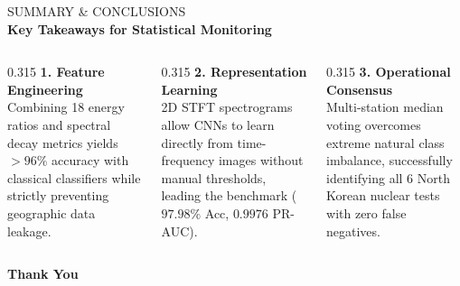 \documentclass[aspectratio=169,11pt]{beamer}
\begin{document}
{
\begin{frame}[plain]
  \vspace*{0.6cm}
  {\fontsize{13}{16}\selectfont \color{tealaccent} SUMMARY \& CONCLUSIONS}\\[0.35em]
  {\fontsize{22}{26}\selectfont \textbf{\color{white} Key Takeaways for Statistical Monitoring}}\\[0.8em]

  \begin{columns}[T,onlytextwidth]
    \begin{column}{0.315\textwidth}
      {\normalsize \textbf{\color{tealaccent} 1. Feature Engineering}}\\[0.3em]
      {\color{white}\small Combining 18 energy ratios and spectral decay metrics yields $>96\%$ accuracy with classical classifiers while strictly preventing geographic data leakage.}
    \end{column}
    \hfill
    \begin{column}{0.315\textwidth}
      {\normalsize \textbf{\color{tealaccent} 2. Representation Learning}}\\[0.3em]
      {\color{white}\small 2D STFT spectrograms allow CNNs to learn directly from time-frequency images without manual thresholds, leading the benchmark ($97.98\%$ Acc, $0.9976$ PR-AUC).}
    \end{column}
    \hfill
    \begin{column}{0.315\textwidth}
      {\normalsize \textbf{\color{tealaccent} 3. Operational Consensus}}\\[0.3em]
      {\color{white}\small Multi-station median voting overcomes extreme natural class imbalance, successfully identifying all 6 North Korean nuclear tests with zero false negatives.}
    \end{column}
  \end{columns}

  \vspace*{1.0cm}
  \centering
  {\fontsize{14}{18}\selectfont \color{white} \textbf{Thank You}}
\end{frame}
}
\end{document}
